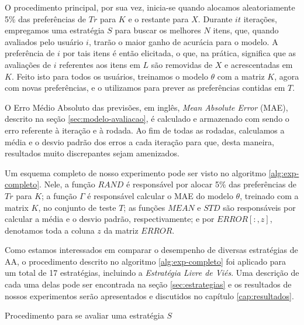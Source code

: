 O procedimento principal, por sua vez, inicia-se quando alocamos aleatoriamente 5\% das preferências de $Tr$ para $K$ e o restante para $X$. Durante $it$ iterações, empregamos uma estratégia $S$ para buscar os melhores $N$ itens, que, quando avaliados pelo usuário $i$, trarão o maior ganho de acurácia para o modelo. A preferência de $i$ por tais itens é então elicitada, o que, na prática, significa que as avaliações de $i$ referentes aos itens em $L$ são removidas de $X$ e acrescentadas em $K$. Feito isto para todos os usuários, treinamos o modelo $\theta$ com a matriz $K$, agora com novas preferências, e o utilizamos para prever as preferências contidas em $T$.

O Erro Médio Absoluto das previsões, em inglês, \textit{Mean Absolute Error} (MAE), descrito na seção \ref{sec:modelo-avaliacao}, é calculado e armazenado com sendo o erro referente à iteração e à rodada. Ao fim de todas as rodadas, calculamos a média e o desvio padrão dos erros a cada iteração para que, desta maneira, resultados muito discrepantes sejam amenizados.

Um esquema completo de nosso experimento pode ser visto no algoritmo \ref{alg:exp-completo}. Nele, a função $RAND$ é responsável por alocar 5\% das preferências de $Tr$ para $K$; a função $\Gamma$ é responsável calcular o MAE do modelo $\theta$, treinado com a matrix $K$, no conjunto de teste $T$; as funções $MEAN$ e $STD$ são responsáveis por calcular a média e o desvio padrão, respectivamente; e por $ERROR[:, z]$, denotamos toda a coluna $z$ da matriz $ERROR$. 

Como estamos interessados em comparar o desempenho de diversas estratégias de AA, o procedimento descrito no algoritmo \ref{alg:exp-completo} foi aplicado para um total de 17 estratégias, incluindo a \textit{Estratégia Livre de Viés}. Uma descrição de cada uma delas pode ser encontrada na seção \ref{sec:estrategias} e os resultados de nossos experimentos serão apresentados e discutidos no capítulo \ref{cap:resultados}.

\begin{algorithm}
\caption{Procedimento para se avaliar uma estratégia $S$} 
\begin{algorithmic}[1]
 
 
 
         
    \EndFor
     
  \EndFor
\EndFor
{} 
\EndFor
\end{algorithmic}
\label{alg:exp-completo}
\end{algorithm}

